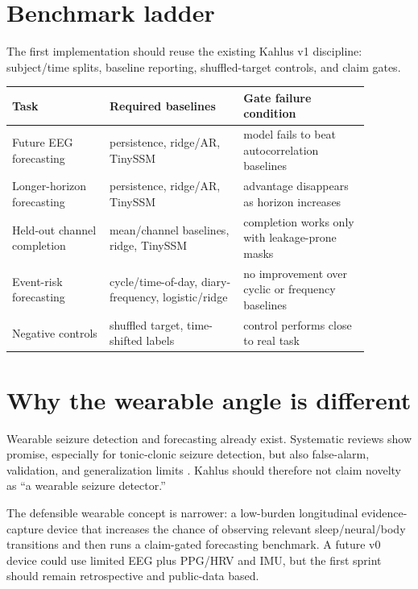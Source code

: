 \documentclass[10pt]{article}
\begin{document}
\section*{Benchmark ladder}
The first implementation should reuse the existing Kahlus v1 discipline: subject/time splits, baseline reporting, shuffled-target controls, and claim gates.

\begin{center}
\begin{tabular}{p{0.24\linewidth}p{0.33\linewidth}p{0.31\linewidth}}
\toprule
Task & Required baselines & Gate failure condition \\
\midrule
Future EEG forecasting & persistence, ridge/AR, TinySSM & model fails to beat autocorrelation baselines \\
Longer-horizon forecasting & persistence, ridge/AR, TinySSM & advantage disappears as horizon increases \\
Held-out channel completion & mean/channel baselines, ridge, TinySSM & completion works only with leakage-prone masks \\
Event-risk forecasting & cycle/time-of-day, diary-frequency, logistic/ridge & no improvement over cyclic or frequency baselines \\
Negative controls & shuffled target, time-shifted labels & control performs close to real task \\
\bottomrule
\end{tabular}
\end{center}

\section*{Why the wearable angle is different}
Wearable seizure detection and forecasting already exist. Systematic reviews show promise, especially for tonic-clonic seizure detection, but also false-alarm, validation, and generalization limits \cite{naganur2022wearables,beniczky2021guideline}. Kahlus should therefore not claim novelty as ``a wearable seizure detector.''

The defensible wearable concept is narrower: a low-burden longitudinal evidence-capture device that increases the chance of observing relevant sleep/neural/body transitions and then runs a claim-gated forecasting benchmark. A future v0 device could use limited EEG plus PPG/HRV and IMU, but the first sprint should remain retrospective and public-data based.
\end{document}
